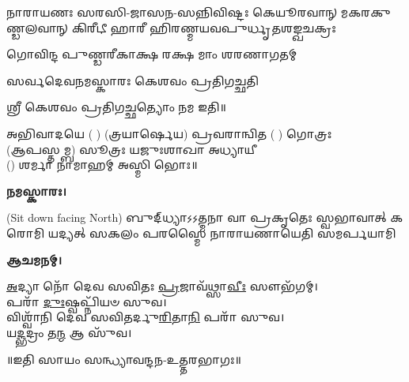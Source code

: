 {𑌨𑌾𑌰𑌾𑌯𑌣𑌃 𑌸𑌰𑌸𑌿-𑌜𑌾𑌸𑌨-𑌸𑌨𑍍𑌨𑌿𑌵𑌿𑌷𑍍𑌟𑌃}
{𑌕𑍇𑌯𑍂𑌰𑌵𑌾𑌨𑍍 𑌮𑌕𑌰𑌕𑍁𑌣𑍍𑌡𑌲𑌵𑌾𑌨𑍍 𑌕𑌿𑌰𑍀𑌟𑍀}
{𑌹𑌾𑌰𑍀 𑌹𑌿𑌰𑌣𑍍𑌮𑌯𑌵𑌪𑍁𑌰𑍍𑌧𑍃𑌤𑌶𑌙𑍍𑌖𑌚𑌕𑍍𑌰𑌃}

{𑌗𑍋𑌵𑌿𑌨𑍍𑌦 𑌪𑍁𑌣𑍍𑌡𑌰𑍀𑌕𑌾𑌕𑍍𑌷 𑌰𑌕𑍍𑌷 𑌮𑌾𑌂 𑌶𑌰𑌣𑌾𑌗𑌤𑌮𑍍}

{𑌸𑌰𑍍𑌵𑌦𑍇𑌵𑌨𑌮𑌸𑍍𑌕𑌾𑌰𑌃 𑌕𑍇𑌶𑌵𑌂 𑌪𑍍𑌰𑌤𑌿𑌗𑌚𑍍𑌛𑌤𑌿}

𑌶𑍍𑌰𑍀 𑌕𑍇𑌶𑌵𑌂 𑌪𑍍𑌰𑌤𑌿𑌗𑌚𑍍𑌛𑌤𑍍𑌯𑍋𑌂 𑌨𑌮 𑌇𑌤𑌿॥

𑌅𑌭𑌿𑌵𑌾𑌦𑌯𑍇 ( ) (𑌤𑍍𑌰𑌯𑌾𑌰𑍍𑌷𑍇𑌯) 𑌪𑍍𑌰𑌵𑌰𑌾𑌨𑍍𑌵𑌿𑌤 ( ) 𑌗𑍋𑌤𑍍𑌰𑌃\\
(𑌆𑌪𑌸𑍍𑌤𑌮𑍍𑌬) 𑌸𑍂𑌤𑍍𑌰𑌃 𑌯𑌜𑍁𑌃𑌶𑌾𑌖𑌾 𑌅𑌧𑍍𑌯𑌾𑌯𑍀\\
() 𑌶𑌰𑍍𑌮𑌾 𑌨𑌾𑌮𑌾𑌹𑌮𑍍 𑌅𑌸𑍍𑌮𑌿 𑌭𑍋𑌃॥

\textbf{𑌨𑌮𑌸𑍍𑌕𑌾𑌰𑌃।}


{\scriptsize (Sit down facing North)}
{𑌬𑍁𑌦𑍍‌𑌧𑍍𑌯𑌾𑌽𑌽𑌤𑍍𑌮𑌨𑌾 𑌵𑌾 𑌪𑍍𑌰𑌕𑍃𑌤𑍇𑌃 𑌸𑍍𑌵𑌭𑌾𑌵𑌾𑌤𑍍}
{𑌕𑌰𑍋𑌮𑌿 𑌯𑌦𑍍𑌯𑌤𑍍 𑌸𑌕𑌲𑌂 𑌪𑌰𑌸𑍍𑌮𑍈}
{𑌨𑌾𑌰𑌾𑌯𑌣𑌾𑌯𑍇𑌤𑌿 𑌸𑌮𑌰𑍍𑌪𑌯𑌾𑌮𑌿}

\textbf{𑌆𑌚𑌮𑌨𑌮𑍍।}


\-\ul{𑌅}\-𑌦𑍍𑌯𑌾 𑌨𑍋᳴ 𑌦𑍇𑌵 𑌸𑌵𑌿𑌤𑌃 \ul{𑌪𑍍𑌰}\-𑌜𑌾𑌵᳴𑌥𑍍𑌸𑌾\-\ul{𑌵𑍀𑌃} 𑌸𑍗𑌭᳴𑌗𑌮𑍍।\\
𑌪𑌰𑌾᳴ \ul{𑌦𑍁𑌃}\-𑌷𑍍𑌵𑌪𑍍𑌨𑌿᳴𑌯𑍞 𑌸𑍁𑌵।\\
𑌵𑌿𑌶𑍍𑌵𑌾᳴𑌨𑌿 𑌦𑍇𑌵 𑌸𑌵𑌿𑌤𑌰𑍍𑌦𑍁\-\ul{𑌰𑌿}\-𑌤𑌾\-\ul{𑌨𑌿} 𑌪𑌰𑌾᳴ 𑌸𑍁𑌵।\\
𑌯\-\ul{𑌦𑍍𑌭}\-𑌦𑍍𑌰𑌂 𑌤\-\ul{𑌨𑍍𑌮} 𑌆 𑌸𑍁᳴𑌵।

\centerline{॥𑌇𑌤𑌿 𑌸𑌾𑌯𑌂 𑌸𑌨𑍍𑌧𑍍𑌯𑌾𑌵𑌨𑍍𑌦𑌨-𑌉𑌤𑍍𑌤𑌰𑌭𑌾𑌗𑌃॥}
 
















